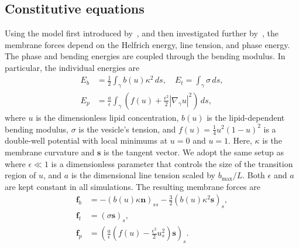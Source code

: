 \documentclass[twoside,twocolumn,9pt]{article}
\newcommand{\ff}{\mathbf{f}}
\newcommand{\nn}{\mathbf{n}}
\renewcommand{\ss}{\mathbf{s}}
\begin{document}

\subsection{Constitutive equations}
Using the model first introduced by~\citet{liu-mar-li-vee-low2017}, and
then investigated further by~\citet{soh-tse-li-voi-low2010}, the
membrane forces depend on the Helfrich energy, line tension, and phase
energy. The phase and bending energies are coupled through the bending
modulus. In particular, the individual energies are
\begin{align}
  E_b &= \frac{1}{2}\int_{\gamma} b(u) \kappa^2 \, ds, \quad
  E_t = \int_{\gamma} \sigma \, ds, \\
  E_p &= \frac{a}{\epsilon}\int_{\gamma}\left(
  f(u) +\frac{\epsilon^2}{2}|\nabla_\gamma u|^2\right) \, ds,
  \label{eqn:PhaseEnergy}
\end{align}
where $u$ is the dimensionless lipid concentration, $b(u)$ is the
lipid-dependent bending modulus, $\sigma$ is the vesicle's tension, and
$f(u) = \frac{1}{4}u^2(1-u)^2$ is a double-well potential with local
minimums at $u=0$ and $u=1$. Here, $\kappa$ is the membrane curvature
and $\ss$ is the tangent vector. We adopt the same setup
as~\citet{soh-tse-li-voi-low2010} where $\epsilon \ll 1$ is a
dimensionless parameter that controls the size of the transition region
of $u$, and $a$ is the dimensional line tension scaled by $b_{\max}/L$.
Both $\epsilon$ and $a$ are kept constant in all simulations. The
resulting membrane forces are
\begin{align}
  \ff_b &= -(b(u)\kappa \nn)_{ss} -\frac{3}{2}
    \left(b(u) \kappa^2 \ss\right)_s, \\
  \ff_t &= (\sigma \ss)_s, \\
  \ff_p &= \left(\frac{a}{\epsilon}\left(f(u) -
     \frac{\epsilon^2}{2} u_s^2\right) \ss \right)_s.
\end{align}
\end{document}
